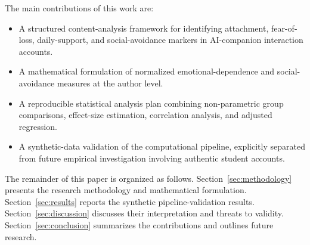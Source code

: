 The main contributions of this work are:
\begin{itemize}
  \item A structured content-analysis framework
        for identifying attachment, fear-of-loss,
        daily-support, and social-avoidance markers
        in AI-companion interaction accounts.
  \item A mathematical formulation of normalized
        emotional-dependence and social-avoidance
        measures at the author level.
  \item A reproducible statistical analysis plan
        combining non-parametric group comparisons,
        effect-size estimation, correlation analysis,
        and adjusted regression.
  \item A synthetic-data validation of the
        computational pipeline, explicitly separated
        from future empirical investigation
        involving authentic student accounts.
\end{itemize}



The remainder of this paper is organized as follows.
Section~\ref{sec:methodology} presents the research
methodology and mathematical formulation.
Section~\ref{sec:results} reports the synthetic
pipeline-validation results.
Section~\ref{sec:discussion} discusses their
interpretation and threats to validity.
Section~\ref{sec:conclusion} summarizes the
contributions and outlines future research.
